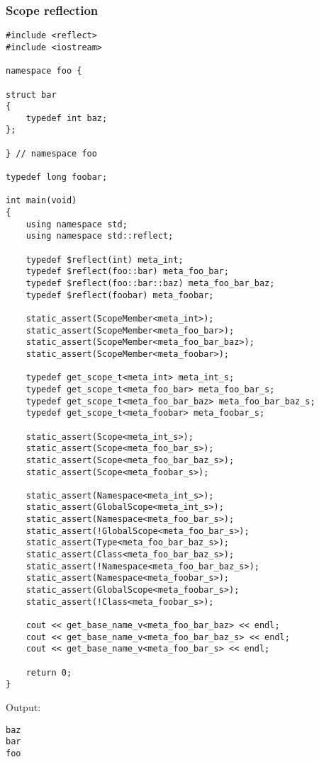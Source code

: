 \subsubsection{Scope reflection}

\begin{verbatim}
#include <reflect>
#include <iostream>

namespace foo {

struct bar
{
	typedef int baz;
};

} // namespace foo

typedef long foobar;

int main(void)
{
	using namespace std;
	using namespace std::reflect;

	typedef $reflect(int) meta_int;
	typedef $reflect(foo::bar) meta_foo_bar;
	typedef $reflect(foo::bar::baz) meta_foo_bar_baz;
	typedef $reflect(foobar) meta_foobar;

	static_assert(ScopeMember<meta_int>);
	static_assert(ScopeMember<meta_foo_bar>);
	static_assert(ScopeMember<meta_foo_bar_baz>);
	static_assert(ScopeMember<meta_foobar>);

	typedef get_scope_t<meta_int> meta_int_s;
	typedef get_scope_t<meta_foo_bar> meta_foo_bar_s;
	typedef get_scope_t<meta_foo_bar_baz> meta_foo_bar_baz_s;
	typedef get_scope_t<meta_foobar> meta_foobar_s;

	static_assert(Scope<meta_int_s>);
	static_assert(Scope<meta_foo_bar_s>);
	static_assert(Scope<meta_foo_bar_baz_s>);
	static_assert(Scope<meta_foobar_s>);

	static_assert(Namespace<meta_int_s>);
	static_assert(GlobalScope<meta_int_s>);
	static_assert(Namespace<meta_foo_bar_s>);
	static_assert(!GlobalScope<meta_foo_bar_s>);
	static_assert(Type<meta_foo_bar_baz_s>);
	static_assert(Class<meta_foo_bar_baz_s>);
	static_assert(!Namespace<meta_foo_bar_baz_s>);
	static_assert(Namespace<meta_foobar_s>);
	static_assert(GlobalScope<meta_foobar_s>);
	static_assert(!Class<meta_foobar_s>);

	cout << get_base_name_v<meta_foo_bar_baz> << endl;
	cout << get_base_name_v<meta_foo_bar_baz_s> << endl;
	cout << get_base_name_v<meta_foo_bar_s> << endl;

	return 0;
}
\end{verbatim}

Output:

\begin{verbatim}
baz
bar
foo
\end{verbatim}

